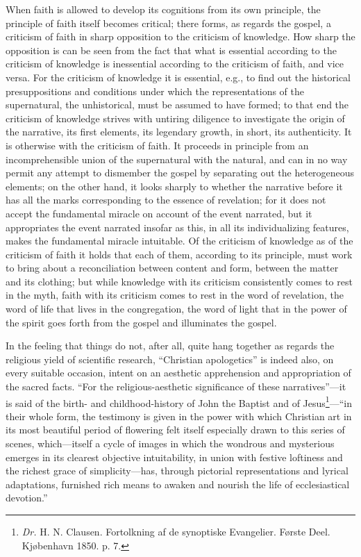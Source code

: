 \documentclass[12pt]{book}
\newcommand{\opage}[1]{\marginnote{\footnotesize\textit{[#1]}}}
\begin{document}
When faith is allowed to develop its cognitions from its own principle, the principle of faith itself becomes critical; there forms, as regards the gospel, a criticism of faith in sharp opposition to the criticism of knowledge. How sharp the opposition is can be seen from the fact that what is essential according to the criticism of knowledge is inessential according to the criticism of faith, and vice versa. For the criticism of knowledge it is essential, e.g., to find out the historical presuppositions and conditions under which the representations of the supernatural, the unhistorical, must be assumed to have formed; to that end the criticism of knowledge strives with untiring diligence to investigate the origin of the narrative, its first elements, its legendary growth, in short, its authenticity. It is otherwise with the criticism of faith. It proceeds in principle from an incomprehensible union of the supernatural with the natural, and can in no way permit any attempt to dismember the gospel by separating out the heterogeneous elements; on the other hand, it looks sharply to whether the narrative before it has all the marks corresponding to the essence of revelation; for it does not accept the fundamental miracle on account of the event narrated, but it appropriates the event narrated insofar as this, in all its individualizing features, makes the fundamental miracle intuitable. Of the criticism of knowledge as of the criticism of faith it holds that each of them, according to its
\opage{57}\setcounter{footnote}{0}%
principle, must work to bring about a reconciliation between content and form, between the matter and its clothing; but while knowledge with its criticism consistently comes to rest in the myth, faith with its criticism comes to rest in the word of revelation, the word of life that lives in the congregation, the word of light that in the power of the spirit goes forth from the gospel and illuminates the gospel.

In the feeling that things do not, after all, quite hang together as regards the religious yield of scientific research, ``Christian apologetics'' is indeed also, on every suitable occasion, intent on an aesthetic apprehension and appropriation of the sacred facts. ``For the religious-aesthetic significance of these narratives''---it is said of the birth- and childhood-history of John the Baptist and of Jesus\footnote{\textit{Dr.} H. N. Clausen. Fortolkning af de synoptiske Evangelier. Første Deel. Kjøbenhavn 1850. p. 7.}---``in their whole form, the testimony is given in the power with which Christian art in its most beautiful period of flowering felt itself especially drawn to this series of scenes, which---itself a cycle of images in which the wondrous and mysterious emerges in its clearest objective intuitability, in union with festive loftiness and the richest grace of simplicity---has, through pictorial representations and lyrical adaptations, furnished rich means to awaken and nourish the life of ecclesiastical devotion.''
\end{document}
